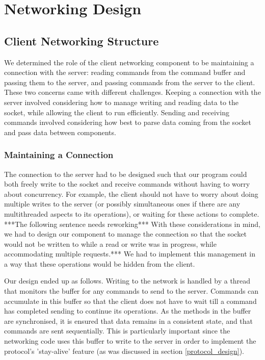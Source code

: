 \section{Networking Design}
\label{networking_design}

\subsection{Client Networking Structure}

We determined the role of the client networking component to be maintaining a connection with the server: reading commands from the command buffer and passing them to the server, and passing commands from the server to the client. These two concerns came with different challenges. Keeping a connection with the server involved considering how to manage writing and reading data to the socket, while allowing the client to run efficiently. Sending and receiving commands involved considering how best to parse data coming from the socket and pass data between components.

\subsubsection {Maintaining a Connection}

The connection to the server had to be designed such that our program could both freely write to the socket and receive commands without having to worry about concurrency. For example, the client should not have to worry about doing multiple writes to the server (or possibly simultaneous ones if there are any multithreaded aspects to its operations), or waiting for these actions to complete. ***The following sentence needs reworking*** With these considerations in mind, we had to design our component to manage the connection so that the socket would not be written to while a read or write was in progress, while accommodating multiple requests.*** We had to implement this management in a way that these operations would be hidden from the client.

Our design ended up as follows. Writing to the network is handled by a thread that monitors the buffer for any commands to send to the server. Commands can accumulate in this buffer so that the client does not have to wait till a command has completed sending to continue its operations. As the methods in the buffer are synchronised, it is ensured that data remains in a consistent state, and that commands are sent sequentially. This is particularly important since the networking code uses this buffer to write to the server in order to implement the protocol's 'stay-alive' feature (as was discussed in section \ref{protocol_design}).

